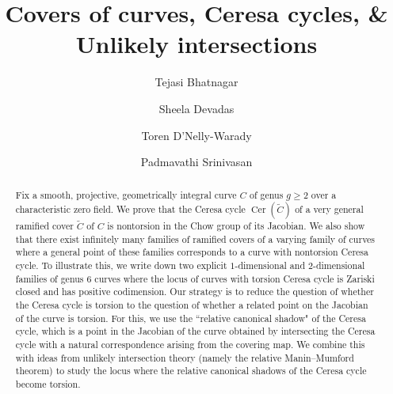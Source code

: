 \documentclass[reqno,10pt]{amsart}
\theoremstyle{definition}
\theoremstyle{definition}
\newcommand{\Cer}{\operatorname{Cer}}
\begin{document}
\title{Covers of curves, Ceresa cycles, \& Unlikely intersections}
\author[T. Bhatnagar]{Tejasi Bhatnagar}\address{The Ohio State University, 100 Math Tower, 231 W 18th Ave, Columbus, OH 43210}
\email{}
\author[S. Devadas]{Sheela Devadas}
\address{University of Maine, Neville Hall, Room 237, 
Orono, ME 04469}
\author[T. D'Nelly-Warady]{Toren D'Nelly-Warady}
\address{University of California, San Diego, 9500 Gilman Drive
La Jolla, CA  92093, USA}


\author[P.~Srinivasan]{Padmavathi Srinivasan}
\address{Boston University, 665 Commonwealth Avenue, Boston, MA 02215, USA}


\date{}



\begin{abstract} Fix a smooth, projective, geometrically integral curve $C$ of genus $g \geq 2$ over a characteristic zero field. We prove that the Ceresa cycle $\Cer(\widetilde{C})$ of a very general ramified cover $\widetilde{C}$  of $C$ is nontorsion in the Chow group of its Jacobian. We also show that there exist infinitely many families of ramified covers of a varying family of curves where a general point of these families corresponds to a curve with nontorsion Ceresa cycle. To illustrate this, we write down two explicit $1$-dimensional and $2$-dimensional families of genus $6$ curves where the locus of curves with torsion Ceresa cycle is Zariski closed and has positive codimension. Our strategy is to reduce the question of whether the Ceresa cycle is torsion to the question of whether a related point on the Jacobian of the curve is torsion. For this, we use the  ``relative canonical shadow" of the Ceresa cycle, which is a point in the Jacobian of the curve obtained by intersecting the Ceresa cycle with a natural correspondence arising from the covering map. We combine this with ideas from unlikely intersection theory (namely the relative Manin--Mumford theorem) to study the locus where the relative canonical shadows of the Ceresa cycle become torsion.
\end{abstract}
\maketitle
\end{document}
